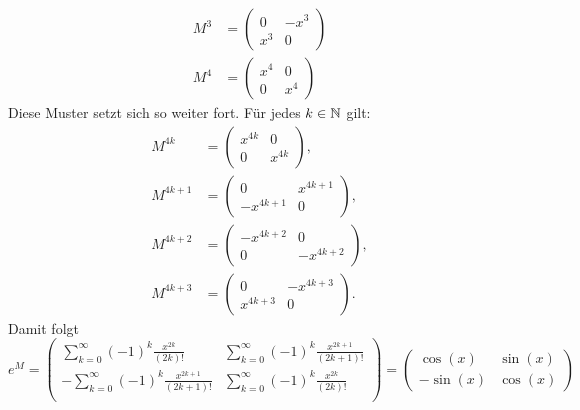 \begin{enumerate}
\begin{align*}
		      M^3 & = \begin{pmatrix} 0 & -x^{3} \\ x^{3} & 0 \end{pmatrix}  \\
		      M^4 & = \begin{pmatrix} x^{4} &  0\\ 0 & x^{4} \end{pmatrix}
	      \end{align*}
	      Diese Muster setzt sich so weiter fort. Für jedes $k\in\mathbb{N}$ gilt:
	      \begin{align*}
		      M^{4k}   & = \begin{pmatrix} x^{4k} &  0\\ 0 & x^{4k} \end{pmatrix},       \\
		      M^{4k+1} & = \begin{pmatrix} 0 & x^{4k+1} \\ -x^{4k+1} & 0 \end{pmatrix},  \\
		      M^{4k+2} & = \begin{pmatrix}  -x^{4k+2} & 0 \\ 0& -x^{4k+2} \end{pmatrix}, \\
		      M^{4k+3} & = \begin{pmatrix} 0 & -x^{4k+3} \\ x^{4k+3} & 0 \end{pmatrix}.
	      \end{align*}
	      Damit folgt
	      $$ e^M = \begin{pmatrix}
			      \sum_{k=0}^\infty (-1)^k \frac{x^{2k}}{(2k)!}      & \sum_{k=0}^\infty (-1)^k \frac{x^{2k+1}}{(2k+1)!} \\
			      -\sum_{k=0}^\infty (-1)^k \frac{x^{2k+1}}{(2k+1)!} & \sum_{k=0}^\infty (-1)^k \frac{x^{2k}}{(2k)!}     \\
		      \end{pmatrix}
		      = \begin{pmatrix}
			      \cos(x)  & \sin(x) \\
			      -\sin(x) & \cos(x)
		      \end{pmatrix}
	      $$
\end{enumerate}